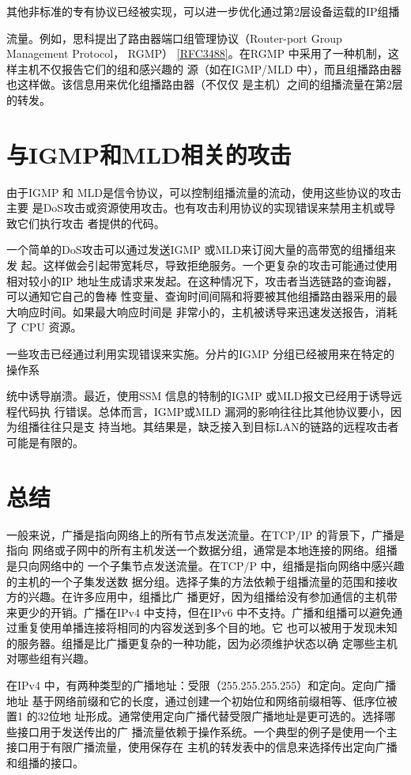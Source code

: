 其他非标准的专有协议已经被实现，可以进一步优化通过第2层设备运载的IP组播

流量。例如，思科提出了路由器端口组管理协议（Router-port Group Management Protocol，
RGMP） \href{https://www.rfc-editor.org/rfc/rfc3488}{[RFC3488]}。在RGMP 中采用了一种机制，这样主机不仅报告它们的组和感兴趣的
源（如在IGMP/MLD 中），而且组播路由器也这样做。该信息用来优化组播路由器（不仅仅
是主机）之间的组播流量在第2层的转发。

\section{与IGMP和MLD相关的攻击}

由于IGMP 和 MLD是信令协议，可以控制组播流量的流动，使用这些协议的攻击主要
是DoS攻击或资源使用攻击。也有攻击利用协议的实现错误来禁用主机或导致它们执行攻击
者提供的代码。

一个简单的DoS攻击可以通过发送IGMP 或MLD来订阅大量的高带宽的组播组来发
起。这样做会引起带宽耗尽，导致拒绝服务。一个更复杂的攻击可能通过使用相对较小的IP
地址生成请求来发起。在这种情况下，攻击者当选链路的查询器，可以通知它自己的鲁棒
性变量、查询时间间隔和将要被其他组播路由器采用的最大响应时间。如果最大响应时间是
非常小的，主机被诱导来迅速发送报告，消耗了 CPU 资源。

一些攻击已经通过利用实现错误来实施。分片的IGMP 分组已经被用来在特定的操作系

统中诱导崩溃。最近，使用SSM 信息的特制的IGMP 或MLD报文已经用于诱导远程代码执
行错误。总体而言，IGMP或MLD 漏洞的影响往往比其他协议要小，因为组播往往只是支
持当地。其结果是，缺乏接入到目标LAN的链路的远程攻击者可能是有限的。

\section{总结}

一般来说，广播是指向网络上的所有节点发送流量。在TCP/IP 的背景下，广播是指向
网络或子网中的所有主机发送一个数据分组，通常是本地连接的网络。组播是只向网络中的
一个子集节点发送流量。在TCP/P 中，组播是指向网络中感兴趣的主机的一个子集发送数
据分组。选择子集的方法依赖于组播流量的范围和接收方的兴趣。在许多应用中，组播比广
播更好，因为组播给没有参加通信的主机带来更少的开销。广播在IPv4 中支持，但在IPv6
中不支持。广播和组播可以避免通过重复使用单播连接将相同的内容发送到多个目的地。它
也可以被用于发现未知的服务器。组播是比广播更复杂的一种功能，因为必须维护状态以确
定哪些主机对哪些组有兴趣。

在IPv4 中，有两种类型的广播地址：受限（255.255.255.255）和定向。定向广播地址
基于网络前缀和它的长度，通过创建一个初始位和网络前缀相等、低序位被置1 的32位地
址形成。通常使用定向广播代替受限广播地址是更可选的。选择哪些接口用于发送传出的广
播流量依赖于操作系统。一个典型的例子是使用一个主接口用于有限广播流量，使用保存在
主机的转发表中的信息来选择传出定向广播和组播的接口。

